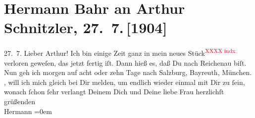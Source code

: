 

         \renewcommand{\erwaehnteWerke}{}
               \section[Hermann Bahr an Arthur Schnitzler, 27. 7. {[}1904{]}]{ Hermann Bahr an Arthur Schnitzler, 27. 7. {[}1904{]}}\nopagebreak{}\rehead{ }\begin{ledgroupsized}[t]{13cm}\normalsize\beginnumbering \toendnotes[C]{\smallbreak\pagebreak[2]} 
\toendnotes[C]{\smallbreak}\pstart
           \raggedleft{}{\pb}27. 7.\pend
           \pstart\center{}Lieber Arthur!\pend\pstart
           Ich bin einige Zeit ganz in mein neues Stück\textcolor{red}{\textsuperscript{XXXX indx}} verloren geweſen, das jetzt fertig iſt. Dann hieß es, daß Du nach Reichenau biſt. Nun geh ich morgen auf acht oder zehn
               Tage nach Salzburg, Bayreuth, München. \label{K_L01419_1v}\label{K_L01419_1h}, will ich mich gleich bei Dir melden, um endlich wieder einmal mit
               Dir zu ſein, wonach ſchon ſehr verlangt Deinem\pend
           \pstart
           Dich und Deine liebe Frau
               herzlichſt grüßenden{\\[\baselineskip]}\spacefill\mbox{Hermann}\pend
           \leftskip=0em{}
         
         \endnumbering{}\end{ledgroupsized}  \newcommand{\dateiname}{L01419}\newcommand{\titel}{Hermann Bahr an Arthur Schnitzler, 27. 7. [1904]}\newcommand{\editorInnen}{ Kurt Ifkovits,  Martin Anton Müller}
      